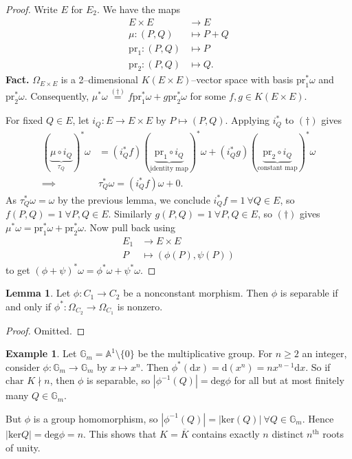 \documentclass{article}
\theoremstyle{definition}
\newtheorem{lemma}[theorem]{Lemma}
\newtheorem{example}{Example}[section]
\begin{document}
\begin{proof}
    Write $E$ for $E_2$. We have the maps
    \begin{align*}
        E \times E &\to E \\
        \mu: (P,Q) &\mapsto P +Q\\
        \text{pr}_1 : (P,Q)&\mapsto P\\
        \text{pr}_2 : (P,Q)&\mapsto Q. 
    \end{align*}
    \textbf{Fact.} $\Omega_{E \times E}$ is a 2--dimensional $K(E \times E)$--vector space with basis $\text{pr}_1^*\omega$ and $\text{pr}_2^*\omega$. Consequently, $\mu^* \omega \stackrel{(\dagger)}{=} f \text{pr}_1^* \omega + g \text{pr}_2^* \omega$ for some $f,g \in K(E \times E)$.
    \vspace{1mm}
     
    For fixed $Q \in E$, let $i_Q : E \to E \times E$ by $P \mapsto (P,Q)$. Applying $i^*_Q$ to $(\dagger)$ gives 
    \begin{align*}
        (\underbrace{\mu \circ i_Q}_{\tau_Q})^* \omega &= (i_Q^* f)(\underbrace{\text{pr}_1 \circ i_Q}_{\text{identity map}})^* \omega + (i_Q^* g)(\underbrace{\text{pr}_2 \circ i_Q}_{\text{constant map}})^* \omega\\
        \implies & \tau_Q^* \omega = (i_Q^*f)\omega + 0.
    \end{align*}
    As $\tau_Q^*\omega = \omega$ by the previous lemma, we conclude $i_Q^*f = 1 ~\forall Q \in E$, so $f(P,Q) = 1 ~\forall P,Q \in E$. Similarly $g(P,Q) = 1 ~\forall P,Q \in E$, so $(\dagger)$ gives $\mu^* \omega = \text{pr}_1^* \omega + \text{pr}_2^* \omega$. Now pull back using
    \begin{align*}
        E_1 &\to E \times E\\
        P &\mapsto (\phi(P),\psi(P))
    \end{align*}
    to get $(\phi+\psi)^*\omega = \phi^* \omega + \psi^* \omega$.
\end{proof}
\begin{lemma}\label{lemma6.4}
    Let $\phi : C_1 \to C_2$ be a nonconstant morphism. Then $\phi$ is separable if and only if $\phi^* : \Omega_{C_2} \to \Omega_{C_1}$ is nonzero.
\end{lemma}
\begin{proof}
    Omitted.
\end{proof}
\begin{example}
    Let $\mathbb{G}_m = \mathbb{A}^1 \setminus \{0\}$ be the multiplicative group. For $n\ge 2$ an integer, consider $\phi : \mathbb{G}_m \to \mathbb{G}_m$ by $x \mapsto x^n$. Then $\phi^*(\mathrm{d}x)=\mathrm{d}(x^n)=nx^{n-1}\mathrm{d}x$. So if $\text{char }K \nmid n$, then $\phi$ is separable, so $\left|\phi^{-1}(Q)\right|=\text{deg} \phi$ for all but at most finitely many $Q \in \mathbb{G}_m$.
    \vspace{1mm}
     
    But $\phi$ is a group homomorphism, so $\left|\phi^{-1}(Q)\right|=\left|\text{ker}(Q)\right| ~\forall Q \in \mathbb{G}_m$. Hence $\left|\text{ker}Q \right| = \text{deg}\phi = n$. This shows that $K = \overline{K}$ contains exactly $n$ distinct $n^{\text{th}}$ roots of unity.
\end{example}
\end{document}
